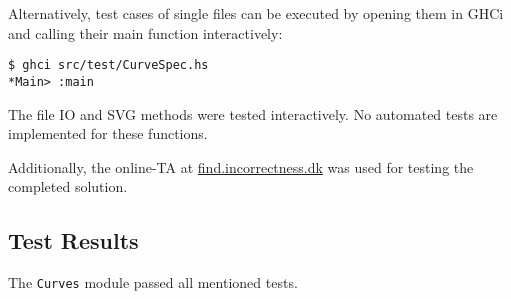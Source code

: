 \documentclass[11pt, a4paper]{article}
\begin{document}
\noindent Alternatively, test cases of single files can be executed by opening them in GHCi and calling their main function interactively:

\begin{lstlisting}[style=Bash]
$ ghci src/test/CurveSpec.hs
*Main> :main
\end{lstlisting}


\noindent  The file IO and SVG methods were tested interactively. No automated tests are implemented for these functions.

\noindent Additionally, the online-TA at \url{find.incorrectness.dk} was used for testing the completed solution.

\subsection{Test Results}
The \texttt{Curves} module passed all mentioned tests.
\end{document}
